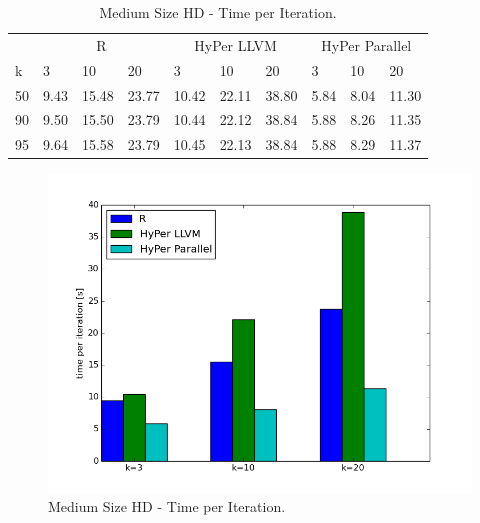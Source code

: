 \begin{table}[htsb]
  \caption[Medium Size HD - Time per Iteration]{Medium Size HD - Time per Iteration.}
  \label{tab:medium_hd_final}
  \centering
  \begin{tabular}{l l l l l l l l l l }
    \toprule
      & \multicolumn{3}{c}{R} & \multicolumn{3}{c}{HyPer LLVM} & \multicolumn{3}{c}{HyPer Parallel}  \\
      k & 3 & 10 & 20 & 3 & 10 & 20 & 3 & 10 & 20 \\
    \midrule
      50  & 9.43 & 15.48 & 23.77 & 10.42 & 22.11 & 38.80 & 5.84 & 8.04 & 11.30 \\
      90  & 9.50 & 15.50 & 23.79 & 10.44 & 22.12 & 38.84 & 5.88 & 8.26 & 11.35 \\
      95  & 9.64 & 15.58 & 23.79 & 10.45 & 22.13 & 38.84 & 5.88 & 8.29 & 11.37 \\
    \bottomrule
  \end{tabular}
\end{table}



\begin{figure}[htsb]
  \centering
  \includegraphics[scale=0.4, trim="0cm 1.5cm 0cm 0cm"]{figures/charts/15Mxhd_final}
  \caption[Medium Size HD - Time per Iteration]{Medium Size HD - Time per Iteration.}
  \label{fig:final_15_hd}
\end{figure}

